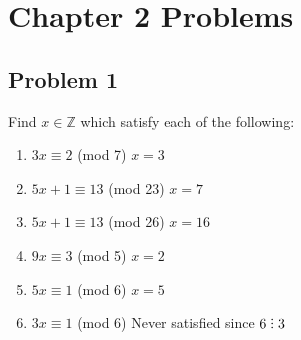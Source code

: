 \documentclass[12pt]{article}
\title{\scalebox{2}{Math 431 Homework 1}}
\author{\scalebox{1.5}{Theo Koss}}
\date{September 2020}
\newcommand{\Z}{\mathbb{Z}}
\newcommand{\divby}{%
  \mathrel{\text{\vbox{\baselineskip.65ex\lineskiplimit0pt\hbox{.}\hbox{.}\hbox{.}}}}%
  }
\begin{document}
\maketitle
\section{Chapter 2 Problems}
\subsection{Problem 1}
Find $x\in\Z$ which satisfy each of the following:
\begin{enumerate}[label=(\alph*)]
    \item $3x\equiv2$ (mod 7)
    $x=3$
    \item $5x+1\equiv13$ (mod 23)
    $x=7$
    \item $5x+1\equiv13$ (mod 26)
    $x=16$
    \item $9x\equiv3$ (mod 5)
    $x=2$
    \item $5x\equiv1$ (mod 6)
    $x=5$
    \item $3x\equiv1$ (mod 6)
    Never satisfied since $6\divby3$
\end{enumerate}
\newpage
\end{document}
